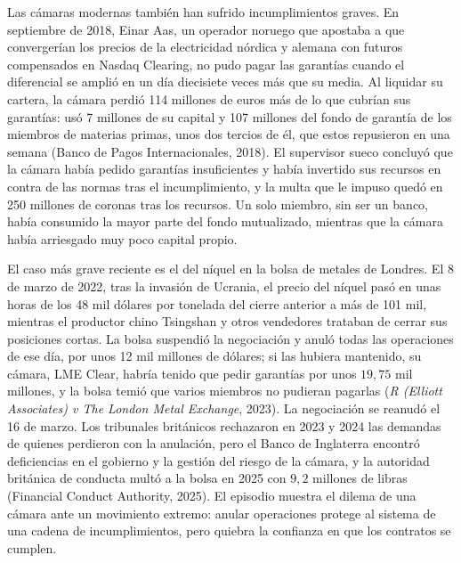 \documentclass[10pt,a4paper]{article}
\begin{document}
Las cámaras modernas también han sufrido incumplimientos graves. En septiembre de 2018, Einar Aas, un operador noruego que apostaba a que convergerían los precios de la electricidad nórdica y alemana con futuros compensados en Nasdaq Clearing, no pudo pagar las garantías cuando el diferencial se amplió en un día diecisiete veces más que su media. Al liquidar su cartera, la cámara perdió 114 millones de euros más de lo que cubrían sus garantías: usó 7 millones de su capital y 107 millones del fondo de garantía de los miembros de materias primas, unos dos tercios de él, que estos repusieron en una semana (Banco de Pagos Internacionales, 2018). El supervisor sueco concluyó que la cámara había pedido garantías insuficientes y había invertido sus recursos en contra de las normas tras el incumplimiento, y la multa que le impuso quedó en 250 millones de coronas tras los recursos. Un solo miembro, sin ser un banco, había consumido la mayor parte del fondo mutualizado, mientras que la cámara había arriesgado muy poco capital propio.

El caso más grave reciente es el del níquel en la bolsa de metales de Londres. El 8 de marzo de 2022, tras la invasión de Ucrania, el precio del níquel pasó en unas horas de los 48 mil dólares por tonelada del cierre anterior a más de 101 mil, mientras el productor chino Tsingshan y otros vendedores trataban de cerrar sus posiciones cortas. La bolsa suspendió la negociación y anuló todas las operaciones de ese día, por unos 12 mil millones de dólares; si las hubiera mantenido, su cámara, LME Clear, habría tenido que pedir garantías por unos $19{,}75$ mil millones, y la bolsa temió que varios miembros no pudieran pagarlas (\textit{R (Elliott Associates) v The London Metal Exchange}, 2023). La negociación se reanudó el 16 de marzo. Los tribunales británicos rechazaron en 2023 y 2024 las demandas de quienes perdieron con la anulación, pero el Banco de Inglaterra encontró deficiencias en el gobierno y la gestión del riesgo de la cámara, y la autoridad británica de conducta multó a la bolsa en 2025 con $9{,}2$ millones de libras (Financial Conduct Authority, 2025). El episodio muestra el dilema de una cámara ante un movimiento extremo: anular operaciones protege al sistema de una cadena de incumplimientos, pero quiebra la confianza en que los contratos se cumplen.
\end{document}
